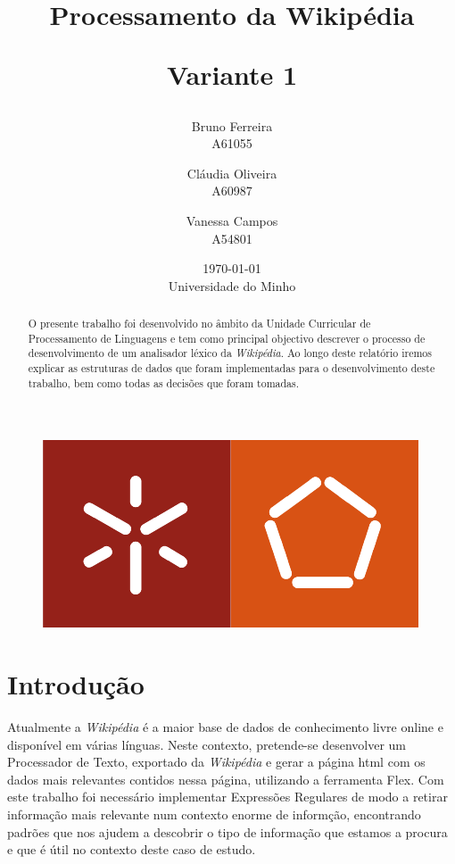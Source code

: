 \documentclass[11pt, a4paper, oneside]{article}
\begin{document}
\title{Processamento da Wikipédia\\
\begin{normalsize}
Variante 1
\end{normalsize}}
\date{\today\\Universidade do Minho}
\author{
  Bruno Ferreira\\
  {\small A61055}\\
  \and
  Cláudia Oliveira\\
  {\small A60987}\\
  \and
  Vanessa Campos\\
  {\small A54801}\\
}

\maketitle

\begin{figure}[h]
\begin{center}
\includegraphics[width=0.4\linewidth]{logo}
\end{center}
\end{figure}


\begin{abstract}

  O presente trabalho foi desenvolvido no âmbito da Unidade Curricular de Processamento de Linguagens e tem como principal objectivo descrever o processo de desenvolvimento de um analisador léxico da \textit{Wikipédia}. Ao longo deste relatório iremos explicar as estruturas de dados que foram implementadas para o desenvolvimento deste trabalho, bem como todas as decisões que foram tomadas.

\end{abstract}
\newpage

\tableofcontents
\listoffigures 

\newpage
\section{Introdução}

Atualmente a \textit{Wikipédia} é a maior base de dados de conhecimento livre online e disponível em várias línguas. Neste contexto, pretende-se desenvolver um Processador de Texto, exportado da \textit{Wikipédia} e gerar a página html com os dados mais relevantes contidos nessa página, utilizando a ferramenta Flex. 
Com este trabalho foi necessário implementar Expressões Regulares de modo a retirar informação mais relevante num contexto enorme de informção, encontrando padrões que nos ajudem a descobrir o tipo de informação que estamos a procura e que é útil no contexto deste caso de estudo.
\end{document}
